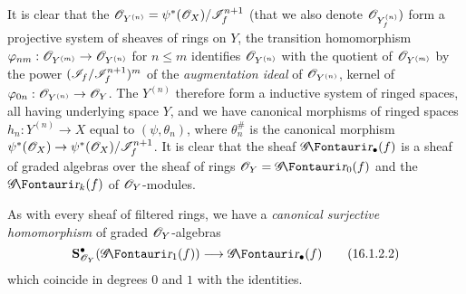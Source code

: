 It is clear that the $\mathscr{O}_{Y^{(n)}} = \psi^*(\mathscr{O}_X)/\mathscr{I}_f^{n+1}$ (that we also denote $\mathscr{O}_{Y_f^{(n)}})$ form a
projective system of sheaves of rings on $Y$, the transition homomorphism $\varphi_{nm}:\sh{O}_{Y^{(m)}} \to \sh{O}_{Y^{(n)}}$ for $n \leq m$ identifies $\mathscr{O}_{Y^{(n)}}$ with the quotient of $\mathscr{O}_{Y^{(m)}}$ by the power $(\mathscr{I}_f/\mathscr{I}_f^{n+1} )^m$ of the \emph{augmentation ideal} of $\mathscr{O}_{Y^{(n)}}$, kernel of $\varphi_{0n}: \sh{O}_{Y^{(n)}} \to \sh{O}_{Y}$.
The $Y^{(n)}$ therefore form a inductive system of ringed spaces, all having underlying space $Y$, and we have canonical morphisms of ringed spaces $h_n: Y^{(n)} \to X$ equal to $(\psi, \theta_n)$, where $\theta^\#_n$ is the canonical morphism $\psi^*(\sh{O}_X) \to \psi^*(\sh{O}_X)/\sh{I}_f^{n+1}$.
It is clear that the sheaf $\shGr_\bullet(f)$ is a sheaf of graded algebras over the sheaf of rings $\sh{O}_Y = \shGr_0(f)$ and the $\shGr_k(f)$ of $\mathscr{O}_Y$-modules.

As with every sheaf of filtered rings, we have a \emph{canonical surjective homomorphism} of graded $\mathscr{O}_Y$-algebras
\[
  \label{IV.16.1.2.2}
  \bb{S}_{\sh{O}_Y}^\bullet(\shGr_1(f)) \to \shGr_\bullet(f)
  \tag{16.1.2.2}
\]
which coincide in degrees $0$ and $1$ with the identities.

